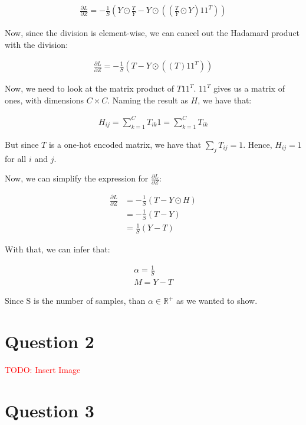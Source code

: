 \documentclass{article}
\begin{document}
\begin{align*}
    \frac{\partial L}{\partial Z} = - \frac{1}{S} \left( Y \odot \frac{T}{Y} - Y \odot \left( \left( \frac{T}{Y} \odot Y \right) 1 1^T \right) \right)
\end{align*}

Now, since the division is element-wise, we can cancel out the Hadamard product with the division:

\begin{align*}
    \frac{\partial L}{\partial Z} = - \frac{1}{S} \left( T - Y \odot \left( \left( T \right) 1 1^T \right) \right)
\end{align*}

Now, we need to look at the matrix product of $T 1 1^T$. $1 1^T$ gives us a matrix of ones, with dimensions $C \times C$.
Naming the result as $H$, we have that: 

\begin{align*}
    H_{ij} = \sum_{k=1}^{C} T_{ik} 1 = \sum_{k=1}^{C} T_{ik}
\end{align*}

But since $T$ is a one-hot encoded matrix, we have that $\sum_{j} T_{ij} = 1$. Hence, $H_{ij} = 1$ for all $i$ and $j$.

Now, we can simplify the expression for $\frac{\partial L}{\partial Z}$:

\begin{align*}
    \frac{\partial L}{\partial Z} &= - \frac{1}{S} \left( T - Y \odot H \right) \\
    &= - \frac{1}{S} \left( T - Y \right) \\
    &= \frac{1}{S} \left( Y - T \right)
\end{align*}

With that, we can infer that: 

\begin{align*}
    \alpha = \frac{1}{S} \\
    M = Y - T
\end{align*}

Since S is the number of samples, than $\alpha \in \mathbb{R}^{+}$ as we wanted to show.

\section*{Question 2}

\textcolor{red}{TODO: Insert Image}


\section*{Question 3}
\end{document}

